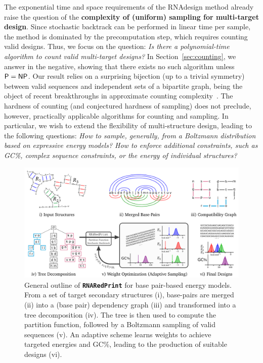 \documentclass{bioinfo}
\newcommand{\Def}[1]{{\bfseries #1}}
\newcommand{\parHead}[1]{\Final{\paragraph{#1}}}
\newcommand{\Final}[1]{\begingroup\color{red!70!black}#1\endgroup}
\renewcommand{\Final}[1]{}
\newcommand{\Nuc}[1]{{\sf #1}}
\newcommand{\Cb}{\Nuc{C}}
\newcommand{\Gb}{\Nuc{G}}
\newcommand{\GCb}{\Gb\Cb}
\newcommand{\Software}[1]{{\ttfamily #1}}
\newcommand{\ourprog}{{\tt \bfseries{}\color{black!75}RNA\textcolor{red!70!black}{Red}Print}}
\begin{document}
\parHead{Motivation.} The exponential time and space requirements of the \Software{RNAdesign} method already raise the question of the \Def{complexity of (uniform) sampling for multi-target design}. Since stochastic backtrack can be performed in linear time per sample, the method is dominated by the precomputation step, which requires counting valid designs. Thus, we focus on the question: \emph{Is there a polynomial-time algorithm to count valid multi-target designs?} In Section~\ref{sec:counting}, we answer in the negative, showing that there exists no such algorithm unless ${\sf P}={\sf NP}$. Our result relies on a surprising bijection (up to a trivial symmetry) between valid sequences  and independent sets of a bipartite graph, being the object of recent breakthroughs in approximate counting complexity~\citep{Bulatov2013,Cai2016}.
The hardness of counting (and conjectured hardness of sampling) does not preclude, however, practically applicable algorithms for counting and sampling. In particular, we wish to extend the flexibility of multi-structure design, leading to the following questions: \emph{How to sample, generally, from a Boltzmann distribution based on expressive energy models? How to enforce additional constraints, such as \GCb\%, complex sequence constraints, or the energy of individual structures?}


\begin{figure}[t]
\begin{center}
    \includegraphics[width=.8\textwidth]{Workflow.pdf}
\end{center}
\caption{General outline of \ourprog{} for base pair-based energy models. From a set of target secondary structures (i), base-pairs are merged (ii) into a (base pair) dependency graph (iii) and transformed into a tree decomposition (iv). The tree is then used to compute the partition function, followed by a Boltzmann sampling of valid sequences (v). An adaptive scheme learns weights to achieve targeted energies and \GCb\%, leading to the production of suitable designs (vi).}
\label{fig:workflow}
\end{figure}
\end{document}
